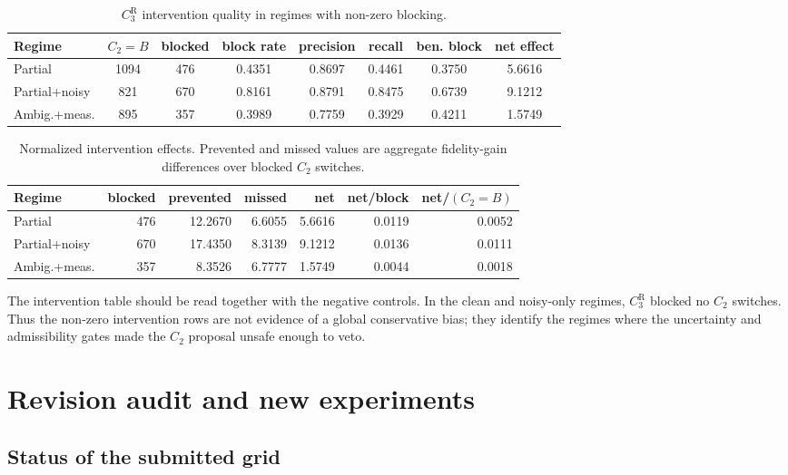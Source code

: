 \documentclass[11pt]{article}
\numberwithin{equation}{section}
\begin{document}
\begin{table}[ht]
\centering
\scriptsize
\caption{$C_3^{\mathrm R}$ intervention quality in regimes with non-zero blocking.}
\label{tab:supp-intervention-quality}
\begin{tabular}{@{}lccccccc@{}}
\toprule
Regime & $C_2=B$ & blocked & block rate & precision & recall &
ben. block & net effect \\
\midrule
Partial & 1094 & 476 & 0.4351 & 0.8697 & 0.4461 & 0.3750 & 5.6616 \\
Partial+noisy & 821 & 670 & 0.8161 & 0.8791 & 0.8475 & 0.6739 & 9.1212 \\
Ambig.+meas. & 895 & 357 & 0.3989 & 0.7759 & 0.3929 & 0.4211 & 1.5749 \\
\bottomrule
\end{tabular}
\end{table}

\begin{table}[ht]
\centering
\scriptsize
\setlength{\tabcolsep}{3pt}
\caption{Normalized intervention effects. Prevented and missed values are
aggregate fidelity-gain differences over blocked $C_2$ switches.}
\label{tab:supp-normalized-intervention}
\begin{tabular}{@{}lrrrrrr@{}}
\toprule
Regime & blocked & prevented & missed & net & net/block & net/$(C_2=B)$ \\
\midrule
Partial & 476 & 12.2670 & 6.6055 & 5.6616 & 0.0119 & 0.0052 \\
Partial+noisy & 670 & 17.4350 & 8.3139 & 9.1212 & 0.0136 & 0.0111 \\
Ambig.+meas. & 357 & 8.3526 & 6.7777 & 1.5749 & 0.0044 & 0.0018 \\
\bottomrule
\end{tabular}
\end{table}

The intervention table should be read together with the negative controls. In the
clean and noisy-only regimes, $C_3^{\mathrm R}$ blocked no $C_2$ switches. Thus
the non-zero intervention rows are not evidence of a global conservative bias; they
identify the regimes where the uncertainty and admissibility gates made the
$C_2$ proposal unsafe enough to veto.

\section{Revision audit and new experiments}\label{sec:revision-si}

\subsection{Status of the submitted grid}
\end{document}
